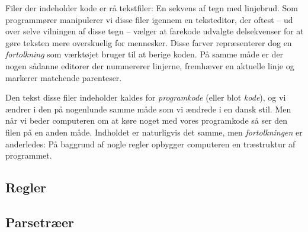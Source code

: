 Filer der indeholder kode er rå tekstfiler: En sekvens af tegn med linjebrud. Som programmører manipulerer vi disse filer igennem en teksteditor, der oftest -- ud over selve vilningen af disse tegn -- vælger at farekode udvalgte delsekvenser for at gøre teksten mere overskuelig for mennesker. Disse farver repræsenterer dog en \textsl{fortolkning} som værktøjet bruger til at berige koden. På samme måde er der nogen sådanne editorer der nummererer linjerne, fremhæver en aktuelle linje og markerer matchende parenteser.

Den tekst disse filer indeholder kaldes for \textsl{programkode} (eller blot \textsl{kode}), og vi ændrer i den på nogenlunde samme måde som vi ændrede i en dansk stil. Men når vi beder computeren om at køre noget med vores programkode så ser den filen på en anden måde. Indholdet er naturligvis det samme, men \textsl{fortolkningen} er anderledes: På baggrund af nogle regler opbygger computeren en træstruktur af programmet.


\subsection{Regler}


\subsection{Parsetræer}

